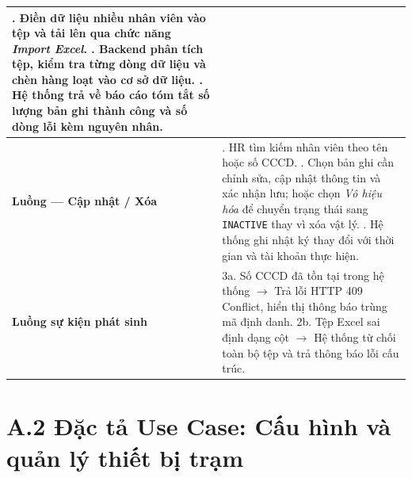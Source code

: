 \documentclass[../DoAn.tex]{subfiles}
\begin{document}
\begin{table}[ht!]
\begin{tabular}{|>{\raggedright\arraybackslash}p{3.5cm}|>{\raggedright\arraybackslash}p{10.1cm}|}
2. Điền dữ liệu nhiều nhân viên vào tệp và tải lên qua chức năng \textit{Import Excel}. \newline
3. Backend phân tích tệp, kiểm tra từng dòng dữ liệu và chèn hàng loạt vào cơ sở dữ liệu. \newline
4. Hệ thống trả về báo cáo tóm tắt số lượng bản ghi thành công và số dòng lỗi kèm nguyên nhân. \\ \hline
\textbf{Luồng — Cập nhật / Xóa} &
1. HR tìm kiếm nhân viên theo tên hoặc số CCCD. \newline
2. Chọn bản ghi cần chỉnh sửa, cập nhật thông tin và xác nhận lưu; hoặc chọn \textit{Vô hiệu hóa} để chuyển trạng thái sang \texttt{INACTIVE} thay vì xóa vật lý. \newline
3. Hệ thống ghi nhật ký thay đổi với thời gian và tài khoản thực hiện. \\ \hline
\textbf{Luồng sự kiện phát sinh} &
3a. Số CCCD đã tồn tại trong hệ thống $\rightarrow$ Trả lỗi HTTP 409 Conflict, hiển thị thông báo trùng mã định danh. \newline
2b. Tệp Excel sai định dạng cột $\rightarrow$ Hệ thống từ chối toàn bộ tệp và trả thông báo lỗi cấu trúc. \\ \hline
\end{tabular}
\end{table}

\section*{A.2 Đặc tả Use Case: Cấu hình và quản lý thiết bị trạm}
\label{appendix:uc_device}
\end{document}
